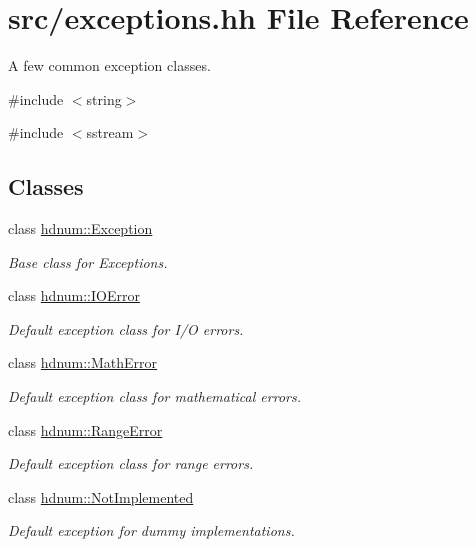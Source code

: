 \hypertarget{exceptions_8hh}{
\section{src/exceptions.hh File Reference}
\label{exceptions_8hh}
}


A few common exception classes.  


{\ttfamily \#include $<$string$>$}\par
{\ttfamily \#include $<$sstream$>$}\par
\subsection*{Classes}
\begin{DoxyCompactItemize}
\item 
class \hyperlink{classhdnum_1_1Exception}{hdnum::Exception}
\begin{DoxyCompactList}\small\item\em Base class for Exceptions. \item\end{DoxyCompactList}\item 
class \hyperlink{classhdnum_1_1IOError}{hdnum::IOError}
\begin{DoxyCompactList}\small\item\em Default exception class for I/O errors. \item\end{DoxyCompactList}\item 
class \hyperlink{classhdnum_1_1MathError}{hdnum::MathError}
\begin{DoxyCompactList}\small\item\em Default exception class for mathematical errors. \item\end{DoxyCompactList}\item 
class \hyperlink{classhdnum_1_1RangeError}{hdnum::RangeError}
\begin{DoxyCompactList}\small\item\em Default exception class for range errors. \item\end{DoxyCompactList}\item 
class \hyperlink{classhdnum_1_1NotImplemented}{hdnum::NotImplemented}
\begin{DoxyCompactList}\small\item\em Default exception for dummy implementations. \item\end{DoxyCompactList}\item 

\end{DoxyCompactItemize}
